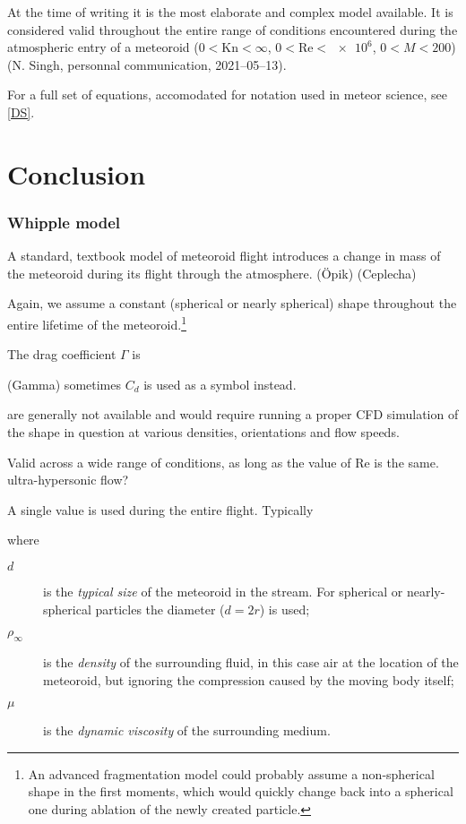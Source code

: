             At the time of writing it is the most elaborate and complex model available.
            It is considered valid throughout the entire range of
            conditions encountered during the atmospheric entry of a meteoroid
            ($0 < \mathrm{Kn} < \infty$, $0 < \mathrm{Re} < \num{e6}$, $0 < M < 200$)
            (N. Singh, personnal communication, 2021--05--13).

            For a full set of equations, accomodated for notation used in meteor science, see \cref{DS}.

\section{Conclusion} \label{dc}

    \subsubsection{Whipple model} \label{mmw}
        A standard, textbook model of meteoroid flight introduces a change in mass of the meteoroid
        during its flight through the atmosphere. 
        (Öpik) (Ceplecha)

        Again, we assume a constant (spherical or nearly spherical) shape throughout the entire
        lifetime of the meteoroid.\footnote{An advanced fragmentation model could probably assume a non-spherical
        shape in the first moments, which would quickly change back into a spherical one during ablation
        of the newly created particle.}

        The drag coefficient $\Gamma$ is 

        (Gamma) sometimes $C_d$ is used as a symbol instead.

        are generally not available and would require running a proper CFD simulation
        of the shape in question at various densities, orientations and flow speeds.

        Valid across a wide range of conditions, as long as the value of Re is the same.
        ultra-hypersonic flow?

        A single value is used during the entire flight. Typically


        where
        \begin{description}
            \item[$d$] is the \emph{typical size} of the meteoroid in the stream.
                For spherical or nearly-spherical particles the diameter ($d = 2r$) is used;
            \item[$\rho_\infty$] is the \emph{density} of the surrounding fluid, in this case
                air at the location of the meteoroid, but ignoring the compression caused
                by the moving body itself;
            \item[$\mu$] is the \emph{dynamic viscosity} of the surrounding medium.
        \end{description}

